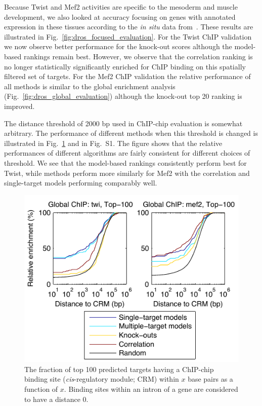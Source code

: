 \documentclass{pnastwo}
\begin{document}
\begin{article}
Because Twist and Mef2 activities are specific to the mesoderm and
muscle development, we also looked at accuracy focusing on genes
with annotated expression in these tissues according to the
\emph{in situ} data from~\cite{Tomancak2002}. These results are
illustrated in Fig.~\ref{fig:dros_focused_evaluation}. For the Twist
ChIP validation we now observe better performance for the knock-out
scores although the model-based rankings remain best. However, we
observe that the correlation ranking is no longer statistically
significantly enriched for ChIP binding on this spatially filtered set
of targets. For the Mef2 ChIP validation the relative performance of
all methods is similar to the global enrichment analysis
(Fig.~\ref{fig:dros_global_evaluation}) although the knock-out top 20
ranking is improved.


The distance threshold of 2000 bp used in ChIP-chip evaluation is
somewhat arbitrary.  The performance of different methods when this
threshold is changed is illustrated in
Fig.~\ref{fig:dros_binding_site_distances} and in Fig.~S1.
The figure shows that the relative performances of
different algorithms are fairly consistent for different choices of threshold. 
We see that the model-based rankings consistently perform best for Twist, while 
methods perform more similarly for Mef2 with the correlation and single-target models 
performing comparably well.

\begin{figure}[tb]
  \centering
  \includegraphics{fig5}
  \caption{The fraction of top 100 predicted targets having a ChIP-chip
    binding site (\emph{cis}-regulatory module; CRM)
    within $x$ base pairs as a function of $x$.
    Binding sites within an intron of a gene are considered to
    have a distance 0.
    \label{fig:dros_binding_site_distances}}
\end{figure}


\end{article}
\end{document}
